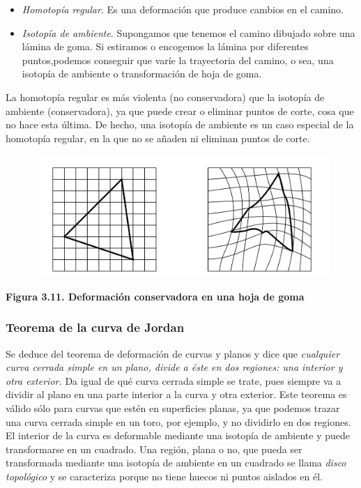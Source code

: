 \begin{itemize}
\item \textit{Homotopía regular}. Es una deformación que produce cambios en el camino.
\item \textit{Isotopía de ambiente}. Supongamos que tenemos el camino dibujado sobre una lámina de goma. Si estiramos o encogemos la lámina por diferentes puntos,podemos conseguir que varíe la trayectoria del camino, o sea, una isotopía de ambiente o transformación de hoja de goma.
\end{itemize}

La homotopía regular es más violenta (no conservadora) que la isotopía de ambiente (conservadora), ya que puede crear o eliminar puntos de corte, cosa que no hace esta última. De hecho, una isotopía de ambiente es un caso especial de la homotopía regular, en la que no se añaden ni eliminan puntos de corte.

\begin{figure}[h]
\includegraphics[width=12cm]{Img/GEO/geo-goma.jpg}
\centering
\end{figure}

\begin{center}
\textbf{Figura 3.11. \footnotesize{Deformación conservadora en una hoja de goma}}
\end{center}

\subsubsection{ Teorema de la curva de Jordan }
Se deduce del teorema de deformación de curvas y planos y dice que \textit{cualquier curva cerrada simple en un plano, divide a éste en dos regiones: una interior y otra exterior.} Da igual de qué curva cerrada simple se trate, pues siempre va a dividir al plano en una
parte interior a la curva y otra exterior. Este teorema es válido sólo para curvas que estén en superficies planas, ya que podemos trazar una curva cerrada simple en un toro, por ejemplo, y no dividirlo en dos regiones.
El interior de la curva es deformable mediante una isotopía de ambiente y puede
transformarse en un cuadrado. Una región, plana o no, que pueda ser transformada mediante una isotopía de ambiente en un cuadrado se llama \textit{disco topológico} y se caracteriza porque no tiene huecos ni puntos aislados en él.

